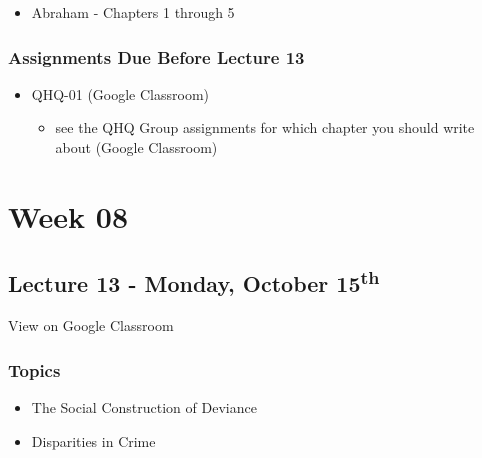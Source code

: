 \documentclass[]{book}
\providecommand{\tightlist}{%
  \setlength{\itemsep}{0pt}\setlength{\parskip}{0pt}}
\theoremstyle{definition}
\theoremstyle{definition}
\theoremstyle{definition}
\theoremstyle{remark}
\begin{document}
\begin{itemize}
\tightlist
\item
  Abraham - Chapters 1 through 5
\end{itemize}

\hypertarget{assignments-due-before-lecture-13}{%
\subsubsection*{Assignments Due Before Lecture
13}\label{assignments-due-before-lecture-13}}

\begin{itemize}
\tightlist
\item
  QHQ-01 (Google Classroom)

  \begin{itemize}
  \tightlist
  \item
    see the QHQ Group assignments for which chapter you should write
    about (Google Classroom)
  \end{itemize}
\end{itemize}

\hypertarget{week-08}{%
\section*{Week 08}\label{week-08}}

\hypertarget{lecture-13---monday-october-15th}{%
\subsection*{\texorpdfstring{Lecture 13 - Monday, October
15\textsuperscript{th}}{Lecture 13 - Monday, October 15th}}\label{lecture-13---monday-october-15th}}

View on Google Classroom

\hypertarget{topics-14}{%
\subsubsection*{Topics}\label{topics-14}}

\begin{itemize}
\tightlist
\item
  The Social Construction of Deviance
\item
  Disparities in Crime
\end{itemize}
\end{document}
